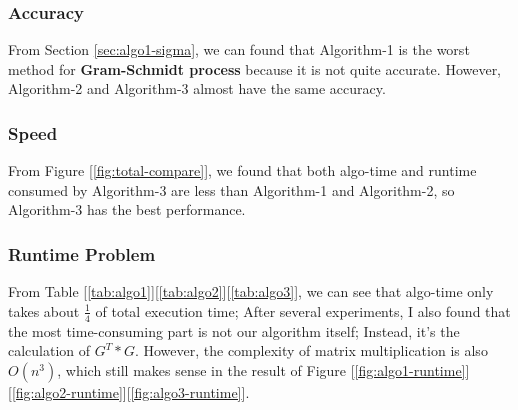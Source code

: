 \documentclass{article}
\begin{document}
\subsubsection{Accuracy}
From Section \ref{sec:algo1-sigma}, we can found that Algorithm-1 is the worst method for \textbf{Gram-Schmidt process} because it is not
quite accurate. However, Algorithm-2 and Algorithm-3 almost have the same accuracy.
\subsubsection{Speed}
From Figure [\ref{fig:total-compare}], we found that both algo-time and runtime consumed by Algorithm-3 are
less than Algorithm-1 and Algorithm-2, so Algorithm-3 has the best performance.
\subsubsection{Runtime Problem}
From Table [\ref{tab:algo1}][\ref{tab:algo2}][\ref{tab:algo3}], we can see that algo-time only takes about $\frac{1}{4}$ of total
execution time; After several experiments, I also found that the most time-consuming part is not our algorithm itself; Instead,
it's the calculation of $G^T * G$. However, the complexity of matrix multiplication is also $O(n^3)$, which still makes sense in 
the result of Figure [\ref{fig:algo1-runtime}][\ref{fig:algo2-runtime}][\ref{fig:algo3-runtime}].

\end{document}
